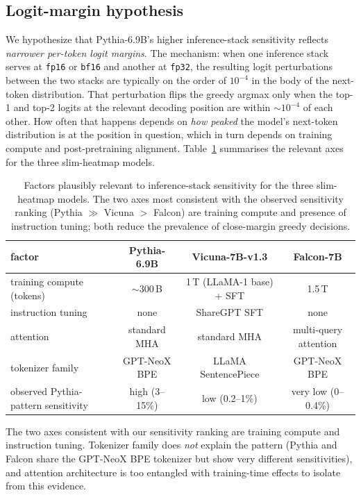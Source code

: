 \documentclass[11pt]{article}
\begin{document}
\subsection{Logit-margin hypothesis}
\label{sec:tr-pythia-logit-margin}

We hypothesize that Pythia-6.9B's higher inference-stack sensitivity
  reflects \emph{narrower per-token logit margins}.
The mechanism: when one inference stack serves at \texttt{fp16} or
  \texttt{bf16} and another at \texttt{fp32}, the resulting logit
  perturbations between the two stacks are typically on the order of
  $10^{-4}$ in the body of the next-token distribution.
That perturbation flips the greedy argmax only when the top-1 and
  top-2 logits at the relevant decoding position are within
  $\sim 10^{-4}$ of each other.
How often that happens depends on \emph{how peaked} the model's
  next-token distribution is at the position in question, which in
  turn depends on training compute and post-pretraining alignment.
Table~\ref{tab:tr-pythia-factors} summarises the relevant axes for
  the three slim-heatmap models.

\begin{table}[htbp]
\centering
\small
\caption{Factors plausibly relevant to inference-stack sensitivity
  for the three slim-heatmap models.
The two axes most consistent with the observed sensitivity ranking
  (Pythia $\gg$ Vicuna $>$ Falcon) are training compute and presence
  of instruction tuning; both reduce the prevalence of close-margin
  greedy decisions.}
\label{tab:tr-pythia-factors}
\begin{tabular}{lccc}
\toprule
factor & Pythia-6.9B & Vicuna-7B-v1.3 & Falcon-7B \\
\midrule
training compute (tokens) & $\sim$300\,B & 1\,T (LLaMA-1 base) + SFT & 1.5\,T \\
instruction tuning        & none         & ShareGPT SFT             & none   \\
attention                 & standard MHA & standard MHA             & multi-query attention \\
tokenizer family          & GPT-NeoX BPE & LLaMA SentencePiece      & GPT-NeoX BPE \\
observed Pythia-pattern sensitivity & high (3--15\%) & low (0.2--1\%) & very low (0--0.4\%) \\
\bottomrule
\end{tabular}
\end{table}

The two axes consistent with our sensitivity ranking are training
  compute and instruction tuning.
Tokenizer family does \emph{not} explain the pattern (Pythia and
  Falcon share the GPT-NeoX BPE tokenizer but show very different
  sensitivities), and attention architecture is too entangled with
  training-time effects to isolate from this evidence.
\end{document}
